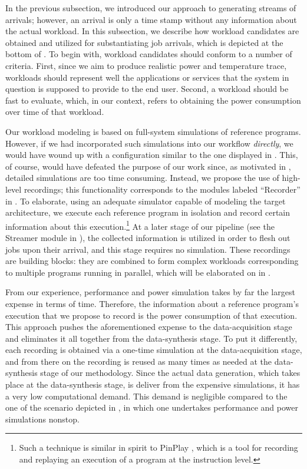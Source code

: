 In the previous subsection, we introduced our approach to generating streams of
arrivals; however, an arrival is only a time stamp without any information about
the actual workload. In this subsection, we describe how workload candidates are
obtained and utilized for substantiating job arrivals, which is depicted at the
bottom of . To begin with, workload candidates should conform
to a number of criteria. First, since we aim to produce realistic power and
temperature trace, workloads should represent well the applications or services
that the system in question is supposed to provide to the end user. Second, a
workload should be fast to evaluate, which, in our context, refers to obtaining
the power consumption over time of that workload.

Our workload modeling is based on full-system simulations of reference programs.
However, if we had incorporated such simulations into our workflow
\emph{directly}, we would have wound up with a configuration similar to the one
displayed in . This, of course, would have defeated the
purpose of our work since, as motivated in , detailed
simulations are too time consuming. Instead, we propose the use of high-level
recordings; this functionality corresponds to the modules labeled ``Recorder''
in . To elaborate, using an adequate simulator capable of
modeling the target architecture, we execute each reference program in isolation
and record certain information about this execution.\footnote{Such a technique
is similar in spirit to PinPlay \cite{patil2010}, which is a tool for recording
and replaying an execution of a program at the instruction level.} At a later
stage of our pipeline (see the Streamer module in ), the
collected information is utilized in order to flesh out jobs upon their arrival,
and this stage requires no simulation. These recordings are building blocks:
they are combined to form complex workloads corresponding to multiple programs
running in parallel, which will be elaborated on in .

From our experience, performance and power simulation takes by far the largest
expense in terms of time. Therefore, the information about a reference program's
execution that we propose to record is the power consumption of that execution.
This approach pushes the aforementioned expense to the data-acquisition stage
and eliminates it all together from the data-synthesis stage. To put it
differently, each recording is obtained via a one-time simulation at the
data-acquisition stage, and from there on the recording is reused as many times
as needed at the data-synthesis stage of our methodology. Since the actual data
generation, which takes place at the data-synthesis stage, is deliver from the
expensive simulations, it has a very low computational demand. This demand is
negligible compared to the one of the scenario depicted in ,
in which one undertakes performance and power simulations nonstop.


